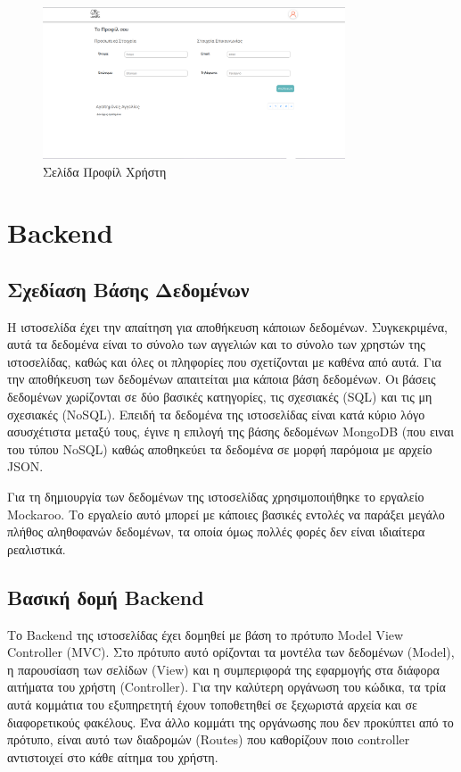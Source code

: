 \documentclass[manuscript,screen,review, language=greek, language=english]{acmart}
\begin{document}
	\begin{figure}[H]
		   \includegraphics[width=0.8\textwidth]{profile_page.png}
		   \caption{Σελίδα Προφίλ Χρήστη}
		   \label{fig:profile}
	\end{figure}


\section{Backend}
\subsection{Σχεδίαση Βάσης Δεδομένων}
	Η ιστοσελίδα έχει την απαίτηση για αποθήκευση κάποιων δεδομένων. Συγκεκριμένα, αυτά
	τα δεδομένα είναι το σύνολο των αγγελιών και το σύνολο των χρηστών της ιστοσελίδας,
	καθώς και όλες οι πληφορίες που σχετίζονται με καθένα από αυτά. Για την αποθήκευση
	των δεδομένων απαιτείται μια κάποια βάση δεδομένων. Οι βάσεις δεδομένων χωρίζονται σε
	δύο βασικές κατηγορίες, τις σχεσιακές (SQL) και τις μη σχεσιακές (NoSQL). Επειδή τα
	δεδομένα της ιστοσελίδας είναι κατά κύριο λόγο ασυσχέτιστα μεταξύ τους, έγινε η
	επιλογή της βάσης δεδομένων MongoDB (που ειναι του τύπου NoSQL) καθώς αποθηκεύει
	τα δεδομένα σε μορφή παρόμοια με αρχείο JSON.

	Για τη δημιουργία των δεδομένων της ιστοσελίδας χρησιμοποιήθηκε το εργαλείο Mockaroo.
	Το εργαλείο αυτό μπορεί με κάποιες βασικές εντολές να παράξει μεγάλο πλήθος
	αληθοφανών δεδομένων, τα οποία όμως πολλές φορές δεν είναι ιδιαίτερα ρεαλιστικά.

\subsection{Βασική δομή Backend}
	Το Backend της ιστοσελίδας έχει δομηθεί με βάση το πρότυπο Model View Controller
	(MVC). Στο πρότυπο αυτό ορίζονται τα μοντέλα των δεδομένων (Model), η παρουσίαση των
	σελίδων (View) και η συμπεριφορά της εφαρμογής στα διάφορα αιτήματα του χρήστη
	(Controller). Για την καλύτερη οργάνωση του κώδικα, τα τρία αυτά κομμάτια του
	εξυπηρετητή έχουν τοποθετηθεί σε ξεχωριστά αρχεία και σε διαφορετικούς φακέλους.
	Ένα άλλο κομμάτι της οργάνωσης που δεν προκύπτει από το πρότυπο, είναι αυτό των
	διαδρομών (Routes) που καθορίζουν ποιο controller αντιστοιχεί στο κάθε αίτημα
	του χρήστη.
\end{document}
